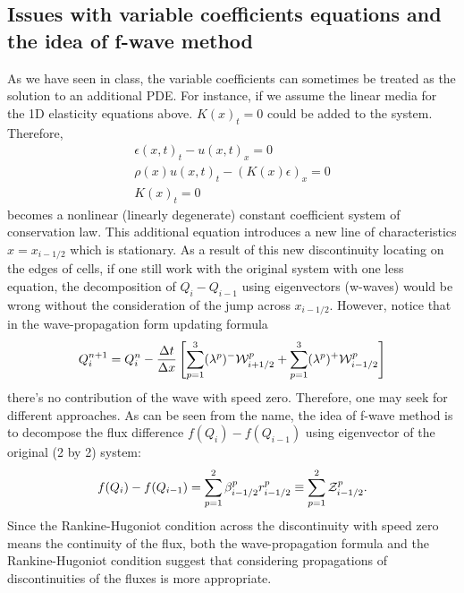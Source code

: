 \documentclass{article}
\begin{document}
\subsection{Issues with variable coefficients equations and the idea of f-wave method}
As we have seen in class, the variable coefficients can sometimes be treated as the solution to an additional PDE. For instance, if we assume the linear media for the 1D elasticity equations above. $K(x)_t=0$ could be added to the system. Therefore,
\begin{align*}
\epsilon(x,t)_t-u(x,t)_x=0 \\
\rho(x) u(x,t)_t-(K(x)\epsilon)_x=0 \\
K(x)_t=0
\end{align*}
becomes a nonlinear (linearly degenerate) constant coefficient system of conservation law. This additional equation introduces a new line of characteristics $x=x_{i-1/2}$ which is stationary. As a result of this new discontinuity locating on the edges of cells, if one still work with the original system with one less equation, the decomposition of $Q_i-Q_{i-1}$ using eigenvectors (w-waves) would be wrong without the consideration of the jump across $x_{i-1/2}$. However, notice that in the wave-propagation form updating formula
\begin{align}
Q_i^{n+1}=Q_i^{n}-\frac{\Delta t}{\Delta x}\left[\sum_{p=1}^{3} (\lambda^p)^-{\cal W}_{i+1/2}^p+\sum_{p=1}^{3} (\lambda^p)^+ {\cal W}_{i-1/2}^p\right]
\end{align}
there's no contribution of the wave with speed zero. Therefore, one may seek for different approaches. As can be seen from the name, the idea of f-wave method is to decompose the flux difference $f(Q_i)-f(Q_{i-1})$ using eigenvector of the original (2 by 2) system:
\begin{align}
f(Q_i)-f(Q_{i-1})=\sum_{p=1}^{2} \beta^p_{i-1/2} r^p_{i-1/2}\equiv \sum_{p=1}^{2} {\cal Z}^p_{i-1/2}.
\end{align}
Since the Rankine-Hugoniot condition across the discontinuity with speed zero means the continuity of the flux, both the wave-propagation formula and the Rankine-Hugoniot condition suggest that considering propagations of discontinuities of the fluxes is more appropriate.
\end{document}
